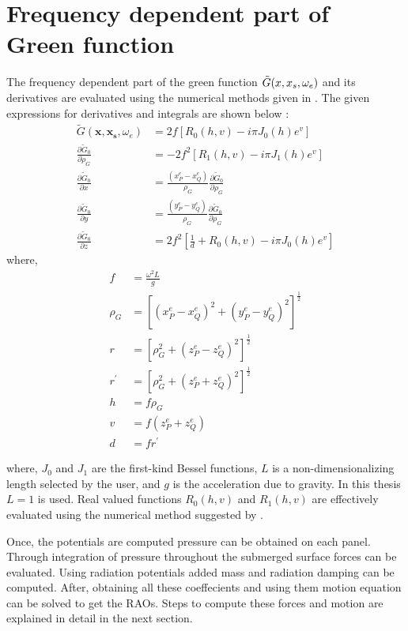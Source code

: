 \section{Frequency dependent part of Green function}
The frequency dependent part of the green function $\Tilde{G}(x, x_s, \omega_e)$ 
and its derivatives are evaluated using the numerical methods given in 
\cite{telste1986numerical}. The given expressions for derivatives and integrals 
are shown below : 
\begin{align}
    \tilde{G}(\boldsymbol{x},\boldsymbol{x_s}, \omega_e) &= 2f\left[ R_0(h,v) - i \pi J_0(h)e^{v}\right]\\
    \frac{\partial{\tilde{G}_0}}{\partial{\rho_G}} &= -2f^{2}\left[R_1(h,v)-i\pi J_{1}(h)e^v\right]\\
    \frac{\partial{\tilde{G}_0}}{\partial{x}} &=\frac{(x^e_P-x^e_Q)}{\rho_G}\frac{\partial{\tilde{G}_0}}{\partial{\rho_G}}\\
    \frac{\partial \tilde{G}_{0}}{\partial y} &= \frac{\left(y^e_P-y^e_Q\right)}{\rho_G} \frac{\partial \tilde{G}_{0}}{\partial \rho_G}\\
    \frac{\partial \tilde{G}_{0}}{\partial z} &= 2 f^{2}\left[\frac{1}{d}+R_{0}(h, v)-i \pi J_{0}(h) e^{v}\right]
\end{align}
where, 
\begin{align}
    f &= \frac{\omega^2 L}{g} \\
    \rho_G &= \left[(x^e_P-x^e_Q)^2 + (y^e_P-y^e_Q)^2\right]^{\frac{1}{2}} \\
    r &= \left[\rho^2_G+(z^e_P-z^e_Q)^2\right]^{\frac{1}{2}} \\
    {r}^{\prime}&= \left[\rho^2_G+(z^e_P+z^e_Q)^2\right]^{\frac{1}{2}} \\
    h &= f\rho_G \\
    v &= f(z^e_P+z^e_Q) \\
    d &= f {r}^{\prime}
\end{align}

where, $J_0$ and $J_1$ are the first-kind Bessel functions, $L$ is a non-dimensionalizing length 
selected by the user, 
and $g$ is the acceleration due to gravity. In this thesis $L=1$ is used. 
Real valued functions $R_0(h,v)$ and $R_1(h,v)$ are effectively evaluated 
using the numerical method suggested by \cite{telste1986numerical}.

Once, the potentials are computed pressure can be obtained on each panel.
Through integration of pressure throughout the submerged surface forces can be evaluated. 
Using radiation potentials added mass and radiation damping can be computed. 
After, obtaining all these coeffecients and using them motion equation can be solved to get the RAOs.
Steps to compute these forces and motion are explained in detail in the next section.